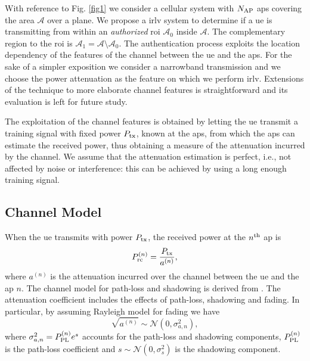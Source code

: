 \documentclass[draftcls,onecolumn,12pt]{IEEEtran}
\begin{document}
With reference to Fig. \ref{fig1} we consider a cellular system with $N_{\rm AP}$ \acp{ap} covering the area $\mathcal{A}$ over a plane. We propose a \ac{irlv} system to determine if a \ac{ue} is transmitting from within an {\em authorized} \ac{roi} $\mathcal{A}_0$ inside  $\mathcal{A}$. The complementary region to the \ac{roi} is  $\mathcal{A}_1=\mathcal{A} \setminus \mathcal{A}_0$. The authentication process exploits the location dependency of the features of the channel between the \ac{ue} and the \acp{ap}.  For the sake of a simpler exposition we consider a narrowband transmission and we choose the power attenuation as the feature on which we perform \ac{irlv}. Extensions of the technique to more elaborate channel features is straightforward and its evaluation is left for future study.

The exploitation of the channel features is obtained by letting the \ac{ue} transmit a training signal with fixed power $P_{\rm tx}$, known at the \acp{ap}, from which the \acp{ap} can estimate the received power, thus obtaining a measure of the attenuation incurred by the channel. We assume that the attenuation estimation is perfect, i.e., not affected by noise or interference: this can be achieved by using a long enough training signal.




\subsection{Channel Model}


When the \ac{ue} transmits with power $P_{\rm tx}$, the received power at the $n^{\rm th}$ \ac{ap} is
\begin{equation}\label{eq: rec pow}
    P_{\rm rc}^{(n)}= \frac{P_{\rm tx}}{a^{(n)}},
\end{equation}
where $a^{(n)}$ is the attenuation incurred over the channel between the \ac{ue} and the \ac{ap} $n$. The channel model for path-loss and shadowing is derived from \cite{3gpp}. The attenuation coefficient includes the effects of path-loss, shadowing and fading. In particular, by assuming Rayleigh model for fading we have 
\begin{equation}
    \sqrt{a^{(n)}} \sim \mathcal{N}\left(0,\sigma_{a,n}^2\right),
\end{equation}
where $\sigma_{a,n}^2={P_{\rm PL}^{(n)}}e^{s}$ accounts for the path-loss and shadowing components, $P_{\rm PL}^{(n)}$ is the path-loss coefficient and $s \sim \mathcal{N}(0,\sigma_s^2)$ is the shadowing component.
\end{document}
